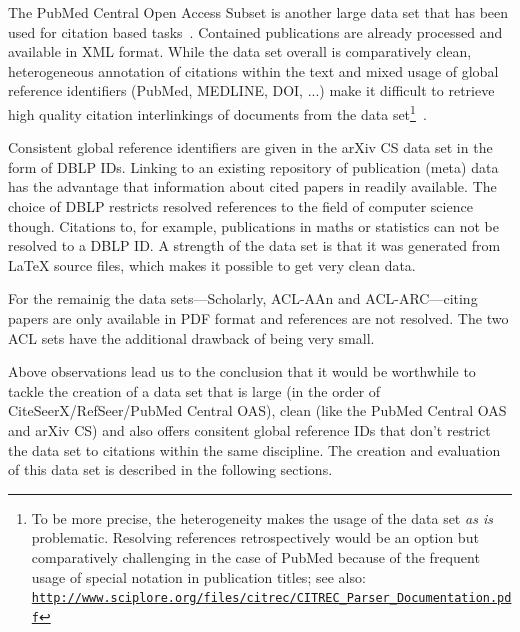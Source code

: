 The PubMed Central Open Access Subset is another large data set that has been used for citation based tasks~\cite{Duma2016,Gipp2015,Galke2018,Bhagavatula2018}. Contained publications are already processed and available in XML format. While the data set overall is comparatively clean, heterogeneous annotation of citations within the text and mixed usage of global reference identifiers (PubMed, MEDLINE, DOI, ...) make it difficult to retrieve high quality citation interlinkings of documents from the data set\footnote{To be more precise, the heterogeneity makes the usage of the data set \emph{as is} problematic. Resolving references retrospectively would be an option but comparatively challenging in the case of PubMed because of the frequent usage of special notation in publication titles; see also: \texttt{\url{http://www.sciplore.org/files/citrec/CITREC_Parser_Documentation.pdf}}}~\cite{Gipp2015}.

Consistent global reference identifiers are given in the arXiv CS data set in the form of DBLP IDs. Linking to an existing repository of publication (meta) data has the advantage that information about cited papers in readily available. The choice of DBLP restricts resolved references to the field of computer science though. Citations to, for example, publications in maths or statistics can not be resolved to a DBLP ID. A strength of the data set is that it was generated from \LaTeX{} source files, which makes it possible to get very clean data.

For the remainig the data sets---Scholarly, ACL-AAn and ACL-ARC---citing papers are only available in PDF format and references are not resolved. The two ACL sets have the additional drawback of being very small.

Above observations lead us to the conclusion that it would be worthwhile to tackle the creation of a data set that is large (in the order of CiteSeerX/RefSeer/PubMed Central OAS), clean (like the PubMed Central OAS and arXiv CS) and also offers consitent global reference IDs that don't restrict the data set to citations within the same discipline. The creation and evaluation of this data set is described in the following sections.



